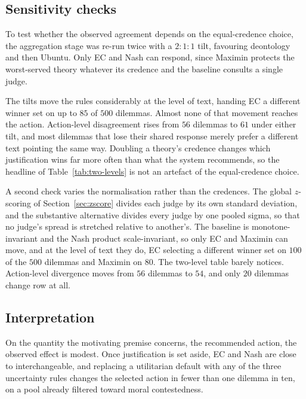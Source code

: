 \documentclass[10pt,twocolumn,a4paper]{article}
\begin{document}
\subsection{Sensitivity checks}
\label{sec:results-credences}

To test whether the observed agreement depends on the equal-credence
choice, the aggregation stage was re-run twice with a $2{:}1{:}1$ tilt,
favouring deontology and then Ubuntu. Only EC and Nash can respond,
since Maximin protects the worst-served theory whatever its credence
and the baseline consults a single judge.

The tilts move the rules considerably at the level of text, handing EC
a different winner set on up to $85$ of $500$ dilemmas. Almost none of
that movement reaches the action. Action-level disagreement rises from
$56$ dilemmas to $61$ under either tilt, and most dilemmas that lose
their shared response merely prefer a different text pointing the same
way. Doubling a theory's credence changes which justification wins far
more often than what the system recommends, so the headline of
Table~\ref{tab:two-levels} is not an artefact of the equal-credence
choice.

A second check varies the normalisation rather than the credences. The
global $z$-scoring of Section~\ref{sec:zscore} divides each judge by
its own standard deviation, and the substantive alternative divides
every judge by one pooled sigma, so that no judge's spread is stretched
relative to another's. The baseline is monotone-invariant and the Nash
product scale-invariant, so only EC and Maximin can move, and at the
level of text they do, EC selecting a different winner set on $100$ of
the $500$ dilemmas and Maximin on $80$. The two-level table barely
notices. Action-level divergence moves from $56$ dilemmas to $54$, and
only $20$ dilemmas change row at all.

\subsection{Interpretation}
\label{sec:results-read}

On the quantity the motivating premise concerns, the recommended action, the
observed effect is modest. Once justification is set aside, EC and Nash are
close to interchangeable, and replacing a utilitarian default with any of
the three uncertainty rules changes the selected action in fewer than one
dilemma in ten, on a pool already filtered toward moral contestedness.
\end{document}
